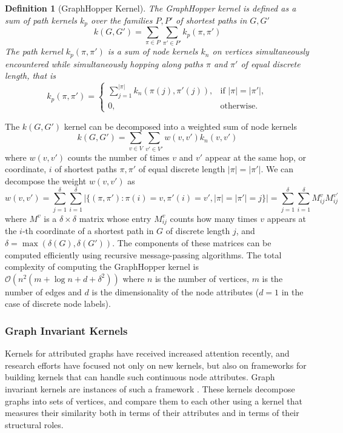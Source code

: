 \documentclass[twoside,11pt]{article}
\newtheorem{definition}{Definition}
\begin{document}
\begin{definition}[GraphHopper Kernel]
  The GraphHopper kernel is defined as a sum of path kernels $k_p$ over the families $P, P'$ of shortest
  paths in $G,G'$
  \begin{equation}
      k(G,G') = \sum_{\pi \in P} \sum_{\pi' \in P'} k_p(\pi, \pi')
  \end{equation}
  The path kernel $k_p(\pi, \pi')$ is a sum of node kernels $k_n$ on vertices simultaneously encountered while simultaneously hopping along paths $\pi$ and $\pi'$ of equal discrete length, that is
  \begin{equation}
      k_p(\pi, \pi') = \begin{cases}
          \sum_{j=1}^{|\pi|} k_n(\pi(j), \pi'(j)), & \text{if $|\pi| = |\pi'|$},\\
          0, & \text{otherwise.} 
          \end{cases}
  \end{equation}
\end{definition}

The $k(G,G')$ kernel can be decomposed into a weighted sum of node kernels
\begin{equation}
    k(G,G') = \sum_{v \in V} \sum_{v' \in V'} w(v,v') k_n(v, v')
\end{equation}
where $w(v,v')$ counts the number of times $v$ and $v'$ appear at the same hop, or coordinate, $i$ of shortest paths $\pi,\pi'$ of equal discrete length $|\pi| = |\pi'|$.
We can decompose the weight $w(v,v')$ as
\begin{equation}
    w(v,v') = \sum_{j=1}^\delta \sum_{i=1}^\delta | \{ (\pi,\pi') : \pi(i)=v, \pi'(i)=v', |\pi|=|\pi'|=j \} | = \sum_{j=1}^\delta \sum_{i=1}^\delta M_{ij}^v M_{ij}^{v'}
\end{equation}
where $M^v$ is a $\delta \times \delta$ matrix whose entry $M_{ij}^v$ counts how many times $v$ appears at the $i$-th coordinate of a shortest path in $G$ of discrete length $j$, and $\delta = \max(\delta(G), \delta(G'))$.
The components of these matrices can be computed efficiently using recursive message-passing algorithms. 
The total complexity of computing the GraphHopper kernel is $\mathcal{O}(n^2(m + \log n + d + \delta^2))$ where $n$ is the number of vertices, $m$ is the number of edges and $d$ is the dimensionality of the node attributes ($d=1$ in the case of discrete node labels).


\subsubsection{Graph Invariant Kernels}
Kernels for attributed graphs have received increased attention recently, and research efforts have focused not only on new kernels, but also on frameworks for building kernels that can handle such continuous node attributes.
Graph invariant kernels are instances of such a framework .
These kernels decompose graphs into sets of vertices, and compare them to each other using a kernel that measures their similarity both in terms of their attributes and in terms of their structural roles.
\end{document}

